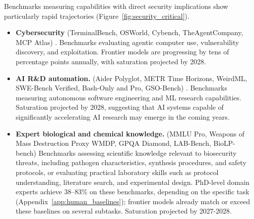 \documentclass[letterpaper,twocolumn]{article}
\begin{document}
Benchmarks measuring capabilities with direct security implications show particularly rapid trajectories (Figure~\ref{fig:security_critical}).
\begin{itemize}
    \item \textbf{Cybersecurity} (TerminalBench, OSWorld, Cybench, TheAgentCompany, MCP Atlas) \citep{merrill_terminal-bench_2026, xie_osworld_2024,zhang_cybench_2025,xu_theagentcompany_2025, bandi_mcp-atlas_2025}. Benchmarks evaluating agentic computer use, vulnerability discovery, and exploitation. Frontier models are progressing by tens of percentage points annually, with saturation projected by 2028.
    
    \item \textbf{AI R\&D automation.} (Aider Polyglot, METR Time Horizons, WeirdML, SWE-Bench Verified, Bash-Only and Pro, GSO-Bench) \citep{aider_aider_2024, kwa_measuring_2025, ihle_weirdml_2025, epoch_ai_swe-bench_2024, jimenez_swe-bench_2024, deng_swe-bench_2025, shetty_gso_2025}. Benchmarks measuring autonomous software engineering and ML research capabilities. Saturation projected by 2028, suggesting that AI systems capable of significantly accelerating AI research may emerge in the coming years.
    
    \item \textbf{Expert biological and chemical knowledge.} (MMLU Pro, Weapons of Mass Destruction Proxy WMDP, GPQA Diamond, LAB-Bench, BioLP-bench) \citep{wang_mmlu-pro_2024, li_wmdp_2024, rein_gpqa_2023, laurent_lab-bench_2024, dev_toward_2025}
    Benchmarks assessing scientific knowledge relevant to biosecurity threats, including pathogen characteristics, synthesis procedures, and safety protocols, or evaluating practical laboratory skills such as protocol understanding, literature search, and experimental design. PhD-level domain experts achieve 38--83\% on these benchmarks, depending on the specific task (Appendix~\ref{app:human_baselines}); frontier models already match or exceed these baselines on several subtasks. Saturation projected by 2027-2028.
\end{itemize}
\end{document}
